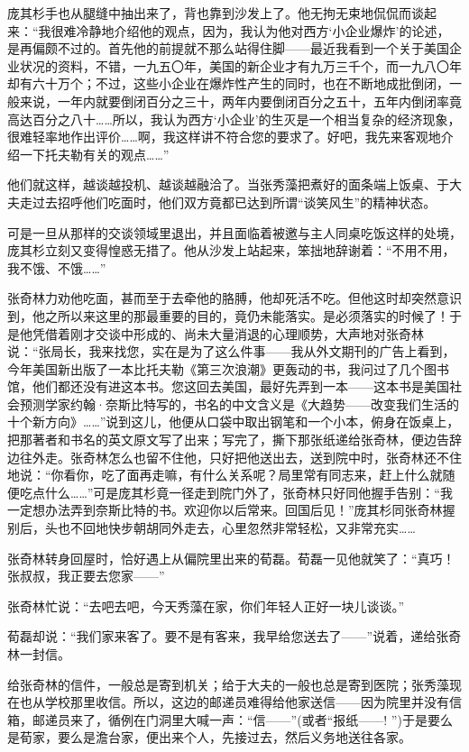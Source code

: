 \par 庞其杉手也从腿缝中抽出来了，背也靠到沙发上了。他无拘无束地侃侃而谈起来：“我很难冷静地介绍他的观点，因为，我认为他对西方‘小企业爆炸’的论述，是再偏颇不过的。首先他的前提就不那么站得住脚——最近我看到一个关于美国企业状况的资料，不错，一九五〇年，美国的新企业才有九万三千个，而一九八〇年却有六十万个；不过，这些小企业在爆炸性产生的同时，也在不断地成批倒闭，一般来说，一年内就要倒闭百分之三十，两年内要倒闭百分之五十，五年内倒闭率竟高达百分之八十……所以，我认为西方‘小企业’的生灭是一个相当复杂的经济现象，很难轻率地作出评价……啊，我这样讲不符合您的要求了。好吧，我先来客观地介绍一下托夫勒有关的观点……”
\par 他们就这样，越谈越投机、越谈越融洽了。当张秀藻把煮好的面条端上饭桌、于大夫走过去招呼他们吃面时，他们双方竟都已达到所谓“谈笑风生”的精神状态。
\par 可是一旦从那样的交谈领域里退出，并且面临着被邀与主人同桌吃饭这样的处境，庞其杉立刻又变得惶惑无措了。他从沙发上站起来，笨拙地辞谢着：“不用不用，我不饿、不饿……”
\par 张奇林力劝他吃面，甚而至于去牵他的胳膊，他却死活不吃。但他这时却突然意识到，他之所以来这里的那最重要的目的，竟仍未能落实。是必须落实的时候了！于是他凭借着刚才交谈中形成的、尚未大量消退的心理顺势，大声地对张奇林说：“张局长，我来找您，实在是为了这么件事——我从外文期刊的广告上看到，今年美国新出版了一本比托夫勒《第三次浪潮》更轰动的书，我问过了几个图书馆，他们都还没有进这本书。您这回去美国，最好先弄到一本——这本书是美国社会预测学家约翰·奈斯比特写的，书名的中文含义是《大趋势——改变我们生活的十个新方向》……”说到这儿，他便从口袋中取出钢笔和一个小本，俯身在饭桌上，把那著者和书名的英文原文写了出来；写完了，撕下那张纸递给张奇林，便边告辞边往外走。张奇林怎么也留不住他，只好把他送出去，送到院中时，张奇林还不住地说：“你看你，吃了面再走嘛，有什么关系呢？局里常有同志来，赶上什么就随便吃点什么……”可是庞其杉竟一径走到院门外了，张奇林只好同他握手告别：“我一定想办法弄到奈斯比特的书。欢迎你以后常来。回国后见！”庞其杉同张奇林握别后，头也不回地快步朝胡同外走去，心里忽然非常轻松，又非常充实……
\par 张奇林转身回屋时，恰好遇上从偏院里出来的荀磊。荀磊一见他就笑了：“真巧！张叔叔，我正要去您家——”
\par 张奇林忙说：“去吧去吧，今天秀藻在家，你们年轻人正好一块儿谈谈。”
\par 荀磊却说：“我们家来客了。要不是有客来，我早给您送去了——”说着，递给张奇林一封信。
\par 给张奇林的信件，一般总是寄到机关；给于大夫的一般也总是寄到医院；张秀藻现在也从学校那里收信。所以，这边的邮递员难得给他家送信——因为院里并没有信箱，邮递员来了，循例在门洞里大喊一声：“信——”(或者“报纸——! ”)于是要么是荀家，要么是澹台家，便出来个人，先接过去，然后义务地送往各家。
